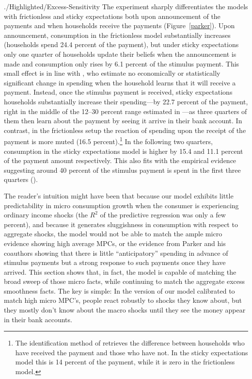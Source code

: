 \begin{verbatimwrite}{./Highlighted/Excess-Sensitivity}
  The experiment sharply differentiates the models with frictionless and sticky expectations both upon announcement of the payments and when households receive the payments (Figure~\ref{parker}). Upon announcement, consumption in the frictionless model substantially increases (households spend 24.4 percent of the payment), but under sticky expectations only one quarter of households update their beliefs when the announcement is made and consumption only rises by 6.1 percent of the stimulus payment.  This small effect is in line with \cite{brodaParker}, who estimate no economically or statistically significant change in spending when the household learns that it will receive a payment.  Instead, once the stimulus payment is received, sticky expectations households substantially increase their spending---by 22.7 percent of the payment, right in the middle of the 12--30 percent range estimated in \cite{psjmMPC2008}---as three quarters of them then learn about the payment by seeing it arrive in their bank account. In contrast, in the frictionless setup the reaction of spending upon the receipt of the payment is more muted (16.5 percent).\footnote{The identification method of \cite{psjmMPC2008} retrieves the difference between households who have received the payment and those who have not. In the sticky expectations model this is 14 percent of the payment, while it is zero in the frictionless model.} In the following two quarters, consumption in the sticky expectations model is higher by 15.4 and 11.1 percent of the payment amount respectively. This also fits with the empirical evidence suggesting around 40 percent of the stimulus payment is spent in the first three quarters (\cite{psjmMPC2008}).

  The reader's intuition might have been that because our model exhibits little predictability in micro consumption growth when the consumer is experiencing ordinary income shocks (the $R^{2}$ of the predictive regression was only a few percent), and because it generates sluggishness in consumption with respect to aggregate shocks, the model would not be able to match the ample micro evidence showing high average MPCs, or the evidence from Parker and his coauthors showing that there is little ``anticipatory'' spending in advance of stimulus payments but a strong response to such payments once they have arrived.  This section shows that, in fact, the model is capable of matching the broad sweep of those micro facts, while continuing to match the aggregate excess smoothness facts.  The key is simple: In the version of our model calibrated to match high micro MPC's, people react robustly to shocks they know about, but they mostly don't know about the macro shocks until they see the money appear in their bank accounts.

\end{verbatimwrite}

